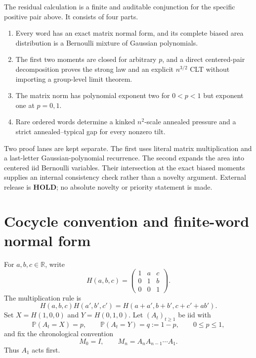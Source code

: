 \documentclass[11pt,a4paper]{amsart}
\theoremstyle{definition}
\theoremstyle{remark}
\newcommand{\Prob}{\mathbb P}
\newcommand{\R}{\mathbb R}
\begin{document}
The residual calculation is a finite and auditable conjunction for the
specific positive pair above.  It consists of four parts.
\begin{enumerate}
\item Every word has an exact matrix normal form, and its complete biased
      area distribution is a Bernoulli mixture of Gaussian polynomials.
\item The first two moments are closed for arbitrary $p$, and a direct
      centered-pair decomposition proves the strong law and an explicit
      $n^{3/2}$ CLT without importing a group-level limit theorem.
\item The matrix norm has polynomial exponent two for $0<p<1$ but exponent
      one at $p=0,1$.
\item Rare ordered words determine a kinked $n^2$-scale annealed pressure
      and a strict annealed--typical gap for every nonzero tilt.
\end{enumerate}

Two proof lanes are kept separate.  The first uses literal matrix
multiplication and a last-letter Gaussian-polynomial recurrence.  The
second expands the area into centered iid Bernoulli variables.  Their
intersection at the exact biased moments supplies an internal consistency
check rather than a novelty argument.  External release is \textbf{HOLD};
no absolute novelty or priority statement is made.

\section{Cocycle convention and finite-word normal form}
\label{sec:normal}

For $a,b,c\in\R$, write
\begin{equation}\label{eq:H-coordinate}
 H(a,b,c)=
 \begin{pmatrix}1&a&c\\0&1&b\\0&0&1\end{pmatrix}.
\end{equation}
The multiplication rule is
\begin{equation}\label{eq:H-law}
 H(a,b,c)H(a',b',c')
 =H(a+a',b+b',c+c'+ab').
\end{equation}
Set $X=H(1,0,0)$ and $Y=H(0,1,0)$.  Let $(A_t)_{t\geq1}$ be iid with
\begin{equation}\label{eq:environment-law}
 \Prob(A_t=X)=p,\qquad \Prob(A_t=Y)=q:=1-p,
 \qquad 0\leq p\leq1,
\end{equation}
and fix the chronological convention
\begin{equation}\label{eq:left-product}
 M_0=I,\qquad M_n=A_nA_{n-1}\cdots A_1.
\end{equation}
Thus $A_1$ acts first.
\end{document}
